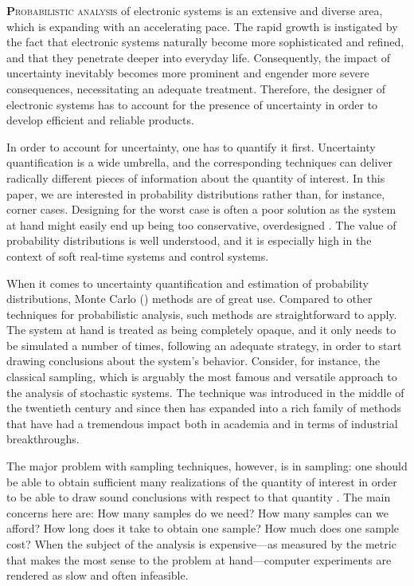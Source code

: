 \lettrine[findent=0.4em, nindent=0em]{\textbf{P}}{robabilistic analysis} of
electronic systems is an extensive and diverse area, which is expanding with an
accelerating pace. The rapid growth is instigated by the fact that electronic
systems naturally become more sophisticated and refined, and that they penetrate
deeper into everyday life. Consequently, the impact of uncertainty inevitably
becomes more prominent and engender more severe consequences, necessitating an
adequate treatment. Therefore, the designer of electronic systems has to account
for the presence of uncertainty in order to develop efficient and reliable
products.

In order to account for uncertainty, one has to quantify it first. Uncertainty
quantification is a wide umbrella, and the corresponding techniques can deliver
radically different pieces of information about the quantity of interest. In
this paper, we are interested in probability distributions rather than, for
instance, corner cases. Designing for the worst case is often a poor solution as
the system at hand might easily end up being too conservative, overdesigned
\cite{quinton2012}. The value of probability distributions is well understood,
and it is especially high in the context of soft real-time systems and control
systems.

When it comes to uncertainty quantification and estimation of probability
distributions, Monte Carlo () methods are of great use. Compared to
other techniques for probabilistic analysis, such methods are straightforward to
apply. The system at hand is treated as being completely opaque, and it only
needs to be simulated a number of times, following an adequate strategy, in
order to start drawing conclusions about the system's behavior. Consider, for
instance, the classical  sampling, which is arguably the most famous
and versatile approach to the analysis of stochastic systems. The technique was
introduced in the middle of the twentieth century and since then has expanded
into a rich family of methods that have had a tremendous impact both in academia
and in terms of industrial breakthroughs.

The major problem with sampling techniques, however, is in sampling: one should
be able to obtain sufficient many realizations of the quantity of interest in
order to be able to draw sound conclusions with respect to that quantity
\cite{diaz-emparanza2002}. The main concerns here are: How many samples do we
need? How many samples can we afford? How long does it take to obtain one
sample? How much does one sample cost? When the subject of the analysis is
expensive---as measured by the metric that makes the most sense to the problem
at hand---computer experiments are rendered as slow and often infeasible.


